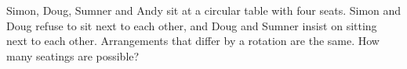Simon, Doug, Sumner and Andy sit at a circular table with four seats. Simon and Doug refuse to sit next to each other, and Doug and Sumner insist on sitting next to each other. Arrangements that differ by a rotation are the same. How many seatings are possible?

